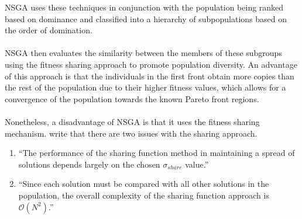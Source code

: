 \documentclass[mscthesis, 11pt]{usiinfthesis}
\theoremstyle{newdefinition}
\begin{document}
NSGA uses these techniques in conjunction with the population being ranked based on dominance and classified into a hierarchy of subpopulations based on the order of domination. 
\\\\
NSGA then evaluates the similarity between the members of these subgroups using the fitness sharing approach to promote population diversity. An advantage of this approach is that the individuals in the first front obtain more copies than the rest of the population due to their higher fitness values, which allows for a convergence of the population towards the known Pareto front regions. \cite[~pp.~91--93]{coello_coello_basic_2007}
\\\\
Nonetheless, a disadvantage of NSGA is that it uses the fitness sharing mechanism. \cite{deb_fast_2002} write that there are two issues with the sharing approach.
\begin{enumerate}
    \item ``The performance of the sharing function method in maintaining a spread of solutions depends largely on the chosen $\sigma_{share}$ value.'' \cite[~p.~184]{deb_fast_2002}
    \item ``Since each solution must be compared with all other solutions in the population, the overall complexity of the sharing function approach is $\mathcal{O}(N^2)$.'' \cite[~p.~185]{deb_fast_2002}
\end{enumerate}
\end{document}

